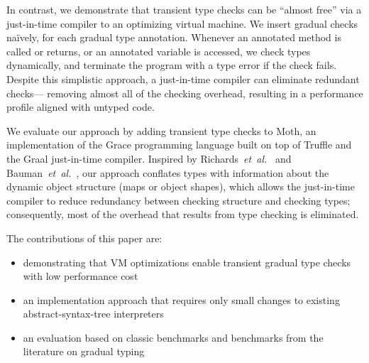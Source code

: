 In contrast, we demonstrate that
transient type checks can be ``almost
free'' via a just-in-time compiler to an
optimizing virtual machine.
We insert 
gradual checks
na\"ively, for each gradual type 
annotation.
Whenever an annotated method is called or
returns, or
an annotated variable is accessed,
we check types dynamically, and
terminate the program with a type error if the check fails.
Despite this simplistic approach, a just-in-time compiler can
eliminate redundant checks---%
removing almost all of the checking overhead,
resulting in a performance profile aligned with untyped code.

We evaluate our approach by adding transient type checks to Moth,
an implementation of the Grace programming language
built on top of Truffle
and the Graal just-in-time compiler\citep{Wurthinger2013,Wurthinger:2017:PPE}.
Inspired by Richards~\textit{et~al.}~\cite{Richards2017} and
Bauman~\textit{et~al.}~\cite{Bauman2017},
our approach conflates types
with information about the dynamic object structure 
(maps\citep{Self} or object shapes\citep{woss2014object}), 
which allows the just-in-time compiler
to reduce redundancy between checking structure
and checking types; consequently, most of the overhead
that results from type checking is eliminated.



The contributions of this paper are:

\begin{itemize}
\item demonstrating that VM optimizations enable
        transient gradual type checks with low performance cost
\item an implementation approach that requires
      only small changes to existing abstract-syntax-tree interpreters
\item an evaluation based on classic benchmarks
      and benchmarks from the literature on gradual typing
\end{itemize}
